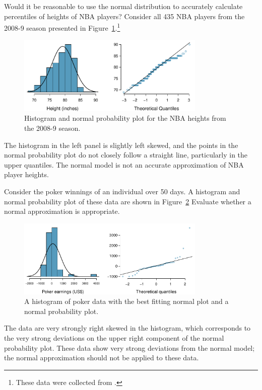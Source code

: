 \begin{example}{Would it be reasonable to use the normal distribution to accurately calculate percentiles of heights of NBA players? Consider all 435 NBA players from the 2008-9 season presented in Figure~\ref{nbaNormal}.\footnote{These data were collected from .}
		
\begin{figure}[h!]
	\centering
	\includegraphics[width=0.80\textwidth]{ch_distributions_oi_biostat/figures/nbaNormal/nbaNormal}
	\caption{Histogram and normal probability plot for the NBA heights from the 2008-9 season.}
	\label{nbaNormal}
\end{figure}		
		
		}
The histogram in the left panel is slightly left skewed, and the points in the normal probability plot do not closely follow a straight line, particularly in the upper quantiles. The normal model is not an accurate approximation of NBA player heights.
\end{example}



\begin{example}{Consider the poker winnings of an individual over 50 days. A histogram and normal probability plot of these data are shown in Figure~\ref{pokerNormal} Evaluate whether a normal approximation is appropriate.
	
	\begin{figure}[h!]
		\centering
		\includegraphics[width=0.80\textwidth]{ch_distributions_oi_biostat/figures/pokerNormal/pokerNormal}
		\caption{A histogram of poker data with the best fitting normal plot and a normal probability plot.}
		\label{pokerNormal}
	\end{figure}	
		
		}
The data are very strongly right skewed in the histogram, which corresponds to the very strong deviations on the upper right component of the normal probability plot. These data show very strong deviations from the normal model; the normal approximation should not be applied to these data.
\end{example}

